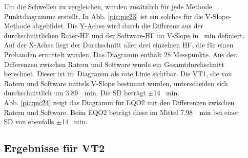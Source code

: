 Um die Schwellen zu vergleichen, wurden zusätzlich für jede Methode Punktdiagramme erstellt. In Abb. \ref{pic:pic23} ist ein solches für die V-Slope-Methode abgebildet. Die Y-Achse wird durch die Differenz aus der durchschnittlichen Rater-\acs{HF} und der Software-\acs{HF} im V-Slope in \si{\per\minute} definiert. Auf der X-Achse liegt der Durchschnitt aller drei einzelnen \acs{HF}, die für einen Probanden ermittelt wurden. Das Diagramm enthält 28 Messpunkte. Aus den Differenzen zwischen Ratern und Software wurde ein Gesamtdurchschnitt berechnet. Dieser ist im Diagramm als rote Linie sichtbar. Die VT1, die von Ratern und Software mittels V-Slope bestimmt wurden, unterscheiden sich durchschnittlich um \SI{3.89}{\per\minute}. Die \ac{SD} beträgt $\pm$14 \si{\per\minute}.\\
Abb. \ref{pic:pic24} zeigt das Diagramm für \acs{EQO2} mit den Differenzen zwischen Ratern und Software. Beim \acs{EQO2} beträgt diese im Mittel \SI{7,98}{\per\minute} bei einer \acs{SD} von ebenfalls $\pm$14 \si{\per\minute}.
\clearpage

\subsection{Ergebnisse für VT2}

